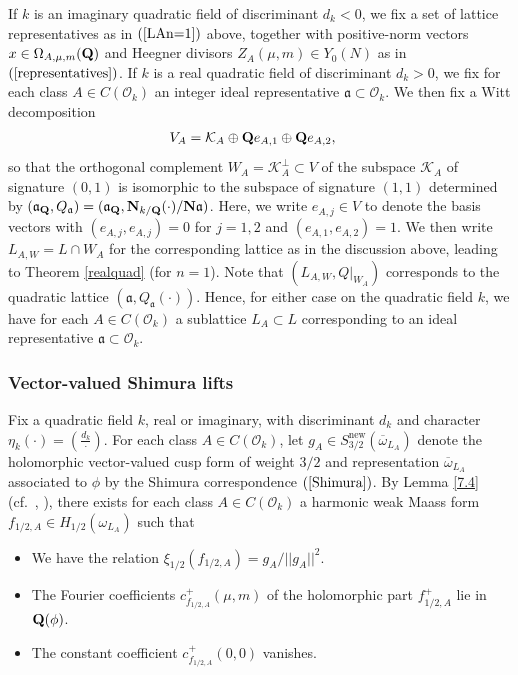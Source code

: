 \documentclass{amsart}
\theoremstyle{definition}
\theoremstyle{definition}
\theoremstyle{definition}
\begin{document}
If $k$ is an imaginary quadratic field of discriminant $d_k <0$, we fix a set of lattice representatives as in $(\ref{LAn=1})$ above, 
together with positive-norm vectors $x \in \Omega_{A, \mu, m}({\bf{Q}})$ and Heegner divisors $Z_A(\mu, m) \in Y_0(N)$ as in $(\ref{representatives})$. 
If $k$ is a real quadratic field of discriminant $d_k>0$, we fix for each class $A \in C(\mathcal{O}_k)$ 
an integer ideal representative $\mathfrak{a} \subset \mathcal{O}_k$. 
We then fix a Witt decomposition
\begin{align*} V_A &= \mathcal{K}_A \oplus {\bf{Q}} e_{A,1} \oplus {\bf{Q}} e_{A,2}, \end{align*}
so that the orthogonal complement $W_A = \mathcal{K}_A^{\perp} \subset V$ of the
subspace $\mathcal{K}_A$ of signature $(0, 1)$ is isomorphic to the subspace of signature $(1,1)$ determined by 
$(\mathfrak{a}_{\bf{Q}}, Q_{\mathfrak{a}}) = (\mathfrak{a}_{\bf{Q}}, {\bf{N}}_{k/{\bf{Q}}}(\cdot)/{\bf{N}} \mathfrak{a})$.
Here, we write $e_{A, j} \in V$ to denote the basis vectors with 
$(e_{A, j}, e_{A, j}) =0$ for $j=1,2$ and $(e_{A,1}, e_{A, 2}) =1$. We then write $L_{A, W} = L \cap W_A$ 
for the corresponding lattice as in the discussion above, leading to Theorem \ref{realquad} (for $n=1$).
Note that $(L_{A,W}, Q\vert_{W_A})$ corresponds to the quadratic lattice $(\mathfrak{a}, Q_{\mathfrak{a}}(\cdot))$.
Hence, for either case on the quadratic field $k$, we have for each $A \in C(\mathcal{O}_k)$ a  
sublattice $L_A \subset L$ corresponding to an ideal representative $\mathfrak{a} \subset \mathcal{O}_k$.

\subsubsection{Vector-valued Shimura lifts}

Fix a quadratic field $k$, real or imaginary, with discriminant $d_k$ and character $\eta_k(\cdot) = (\frac{d_k}{\cdot})$.
For each class $A \in C(\mathcal{O}_k)$, let $g_A \in S_{3/2}^{\operatorname{new}}(\overline{\omega}_{L_A})$ denote the 
holomorphic vector-valued cusp form of weight $3/2$ and representation $\overline{\omega}_{L_A}$ associated to $\phi$ 
by the Shimura correspondence $(\ref{Shimura})$. By Lemma \ref{7.4} (cf.~\cite[Lemma 7.4]{BY}, 
\cite[Lemma 7.3]{BO}), there exists for each class $A \in C(\mathcal{O}_k)$ a harmonic weak Maass form 
$f_{1/2, A} \in H_{1/2}(\omega_{L_A})$ such that  

\begin{itemize}

\item[(i)] We have the relation $\xi_{1/2}(f_{1/2, A}) = g_{A} / \vert \vert g_A \vert \vert^2$. 

\item[(ii)] The Fourier coefficients $c_{f_{1/2, A}}^+(\mu, m)$ of the holomorphic part $f^+_{1/2, A}$ lie in ${\bf{Q}}(\phi)$. 

\item[(iii)] The constant coefficient $c_{f_{1/2, A}}^+(0,0)$ vanishes. 

\end{itemize}
\end{document}
